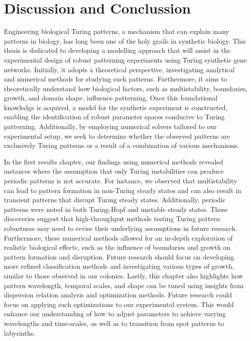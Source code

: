 \chapter{Discussion and Conclussion}

Engineering biological Turing patterns, a mechanism that can explain many patterns in biology, has long been one of the holy grails in synthetic biology.
This thesis is dedicated to developing a modelling approach that will assist in the experimental design of robust patterning experiments using Turing synthetic gene networks.
Initially, it adopts a theoretical perspective, investigating analytical and numerical methods for studying such patterns.
Furthermore, it aims to theoretically understand how biological factors, such as multistability, boundaries, growth, and domain shape, influence patterning.
Once this foundational knowledge is acquired, a model for the synthetic experiment is constructed, enabling the identification of robust parameter spaces conducive to Turing patterning.
Additionally, by employing numerical solvers tailored to our experimental setup, we seek to determine whether the observed patterns are exclusively Turing patterns or a result of a combination of various mechanisms.

In the first results chapter, our findings using numerical methods revealed instances where the assumption that only Turing instabilities can produce periodic patterns is not accurate.
For instance, we observed that multistability can lead to pattern formation in non-Turing steady states and can also result in transient patterns that disrupt Turing steady states.
Additionally, periodic patterns were noted in both Turing-Hopf and unstable steady states.
These discoveries suggest that high-throughput methods testing Turing pattern robustness may need to revise their underlying assumptions in future research.
Furthermore, these numerical methods allowed for an in-depth exploration of realistic biological effects, such as the influence of boundaries and growth on pattern formation and disruption.
Future research should focus on developing more refined classification methods and investigating various types of growth, similar to those observed in our colonies.
Lastly, this chapter also highlights how pattern wavelength, temporal scales, and shape can be tuned using insights from dispersion relation analysis and optimization methods.
Future research could focus on applying such optimizations to our experimental system.
This would enhance our understanding of how to adjust parameters to achieve varying wavelengths and time-scales, as well as to transition from spot patterns to labyrinths.

